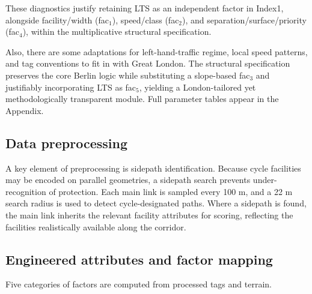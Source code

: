 \documentclass[
  12pt,
  oneside]{book}
\begin{document}
These diagnostics justify retaining LTS as an independent factor in Index1, alongside facility/width (fac\(_1\)), speed/class (fac\(_2\)), and separation/surface/priority (fac\(_4\)), within the multiplicative structural specification.

Also, there are some adaptations for left-hand-traffic regime, local speed patterns, and tag conventions to fit in with Great London.
The structural specification preserves the core Berlin logic while substituting a slope-based fac\(_3\) and justifiably incorporating LTS as fac\(_5\), yielding a London-tailored yet methodologically transparent module. Full parameter tables appear in the Appendix.

\subsection{Data preprocessing}\label{data-preprocessing}

A key element of preprocessing is sidepath identification. Because cycle facilities may be encoded on parallel geometries, a sidepath search prevents under-recognition of protection. Each main link is sampled every 100 m, and a 22 m search radius is used to detect cycle-designated paths. Where a sidepath is found, the main link inherits the relevant facility attributes for scoring, reflecting the facilities realistically available along the corridor.

\subsection{Engineered attributes and factor mapping}\label{engineered-attributes-and-factor-mapping}

Five categories of factors are computed from processed tags and terrain.
\end{document}
